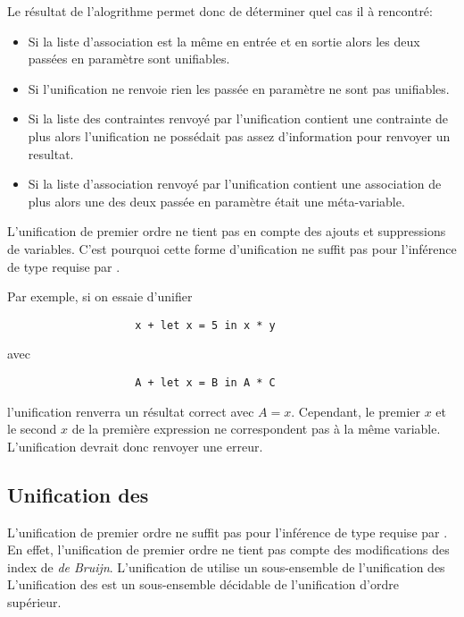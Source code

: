                 Le résultat de l'alogrithme permet donc de déterminer quel cas il à rencontré:
                \begin{itemize}
                    \item Si la liste d'association est la même en entrée et en sortie alors les deux \lexp{} passées en paramètre sont unifiables.
                    \item Si l'unification ne renvoie rien les \lexp{} passée en paramètre ne sont pas unifiables.
                    \item Si la liste des contraintes renvoyé par l'unification contient une contrainte de plus alors l'unification ne possédait pas assez d'information pour renvoyer un resultat.
                    \item Si la liste d'association renvoyé par l'unification contient une association de plus alors une des deux \lexp{} passée en paramètre était une méta-variable.
                \end{itemize}

                L'unification de premier ordre ne tient pas en compte des ajouts et suppressions de variables. C'est pourquoi cette forme d'unification ne suffit
                pas pour l'inférence de type requise par \typer{}.

                Par exemple, si on essaie d'unifier
                \begin{verbatim}
                    x + let x = 5 in x * y
                \end{verbatim}
                avec
                \begin{verbatim}
                    A + let x = B in A * C
                \end{verbatim}
                l'unification renverra un résultat correct avec $A = x$. Cependant, le premier $x$ et le second $x$ de la première expression
                ne correspondent pas à la même variable. L'unification devrait donc renvoyer une erreur.

        \subsection{Unification des \hop{}}
            \structpar{\hop{}}
                L'unification de premier ordre ne suffit pas pour l'inférence de type requise par \typer{}.
                En effet, l'unification de premier ordre ne tient pas compte des modifications des index de \textit{de Bruijn}.
                L'unification de \typer{} utilise un sous-ensemble de l'unification des \hop{}
                L'unification des \hop{} est un sous-ensemble décidable de l'unification d'ordre supérieur.


